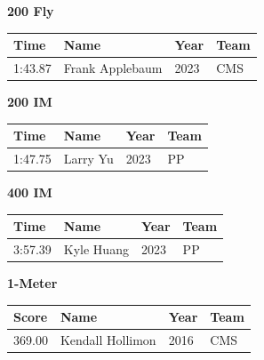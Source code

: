 \vspace{1.2em}
\noindent\begin{minipage}[t]{0.98\textwidth}
\centering
\textbf{\textcolor{teamprimary}{200 Fly}}\par
\vspace{0.5em}
\centering
\small
\renewcommand{\arraystretch}{1.0}
\setlength{\tabcolsep}{4pt}
\begin{tabular}{@{}p{2.5cm}p{4.5cm}p{1.5cm}p{2.5cm}@{}}
\toprule
\textbf{Time} & \textbf{Name} & \textbf{Year} & \textbf{Team} \\
\midrule
1:43.87 & Frank Applebaum & 2023 & CMS \\
\bottomrule
\end{tabular}
\end{minipage}
\vspace{1.2em}
\noindent\begin{minipage}[t]{0.98\textwidth}
\centering
\textbf{\textcolor{teamprimary}{200 IM}}\par
\vspace{0.5em}
\centering
\small
\renewcommand{\arraystretch}{1.0}
\setlength{\tabcolsep}{4pt}
\begin{tabular}{@{}p{2.5cm}p{4.5cm}p{1.5cm}p{2.5cm}@{}}
\toprule
\textbf{Time} & \textbf{Name} & \textbf{Year} & \textbf{Team} \\
\midrule
1:47.75 & Larry Yu & 2023 & PP \\
\bottomrule
\end{tabular}
\end{minipage}
\vspace{1.2em}
\noindent\begin{minipage}[t]{0.98\textwidth}
\centering
\textbf{\textcolor{teamprimary}{400 IM}}\par
\vspace{0.5em}
\centering
\small
\renewcommand{\arraystretch}{1.0}
\setlength{\tabcolsep}{4pt}
\begin{tabular}{@{}p{2.5cm}p{4.5cm}p{1.5cm}p{2.5cm}@{}}
\toprule
\textbf{Time} & \textbf{Name} & \textbf{Year} & \textbf{Team} \\
\midrule
3:57.39 & Kyle Huang & 2023 & PP \\
\bottomrule
\end{tabular}
\end{minipage}
\vspace{1.2em}
\noindent\begin{minipage}[t]{0.98\textwidth}
\centering
\textbf{\textcolor{teamprimary}{1-Meter}}\par
\vspace{0.5em}
\centering
\small
\renewcommand{\arraystretch}{1.0}
\setlength{\tabcolsep}{4pt}
\begin{tabular}{@{}p{2.5cm}p{4.5cm}p{1.5cm}p{2.5cm}@{}}
\toprule
\textbf{Score} & \textbf{Name} & \textbf{Year} & \textbf{Team} \\
\midrule
369.00 & Kendall Hollimon & 2016 & CMS \\
\bottomrule
\end{tabular}
\end{minipage}
